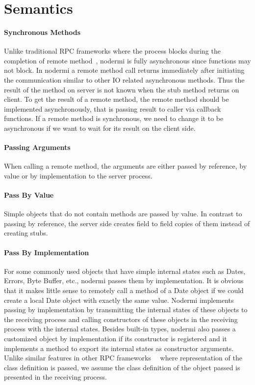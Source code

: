 \section{Semantics}

\nodermiexamplefig{}

\paragraph{Synchronous Methods}
Unlike traditional RPC frameworks where the process blocks during the
completion of remote method~\cite{birrell1984implementing},
nodermi is fully asynchronous since \js{} functions may not block.
In nodermi a remote method call returns immediately after initiating the communication
similar to other IO related asynchronous methods.
Thus the result of the method on server 
is not known when the stub method returns on client.
To get the result of a remote method,
the remote method should be implemented asynchronously,
that is passing result to caller via callback functions.
If a remote method is synchronous,
we need to change it to be asynchronous if
we want to wait for its result on the client side.


\paragraph{Passing Arguments}
When calling a remote method, the arguments are either
passed by reference, by value or by implementation to
the server process.

\paragraph{Pass By Value}
Simple objects that do not contain methods
 are passed by value.
In contrast to passing by reference,
the server side creates field to field copies of them instead of creating
stubs.

\paragraph{Pass By Implementation}
For some commonly used objects that have simple
internal states such as Dates, Errors, Byte Buffer, etc.,
nodermi passes them by implementation.
It is obvious that it makes little sense to remotely
call a method of a Date object if we could create
a local Date object with exactly the same value.
Nodermi implements passing by implementation by transmitting the internal
states of these objects to the receiving process and 
calling constructors
of these objects in the receiving process with the internal states.
Besides built-in types,
nodermi also passes a customized object by implementation if
its constructor is registered and it implements a method
to export its internal states as constructor arguments.
Unlike similar features
 in other RPC frameworks~\cite{birrell1993distributed}~\cite{j2eedoc}
 where representation of the class definition is passed,
we assume the class definition of the object passed is presented
in the receiving process.


